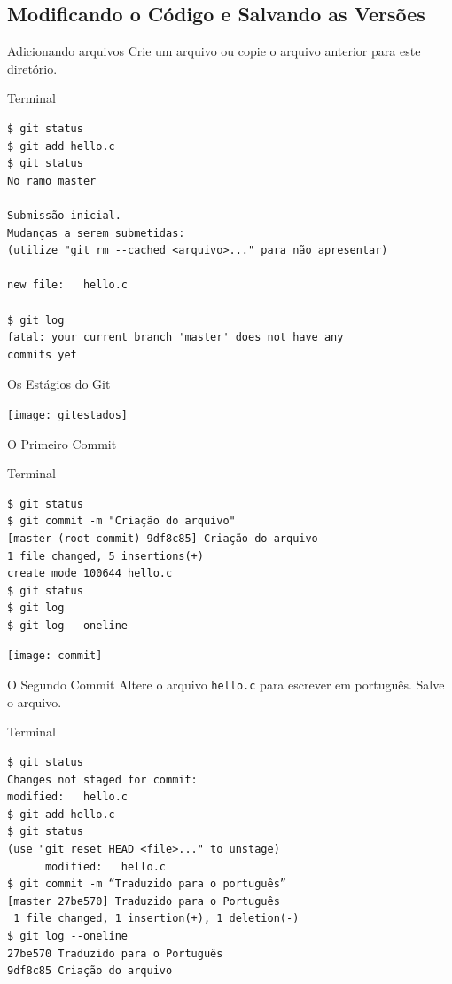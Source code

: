 \subsection{Modificando o Código e Salvando as Versões}
\begin{frame}[fragile]{Adicionando arquivos}
Crie um arquivo  ou copie o arquivo anterior para este diretório. 
\begin{terminal}{Terminal}
\begin{Verbatim}[fontseries=b]
$ git status
$ git add hello.c
$ git status 
No ramo master

Submissão inicial.
Mudanças a serem submetidas:
(utilize "git rm --cached <arquivo>..." para não apresentar)

new file:   hello.c

$ git log
fatal: your current branch 'master' does not have any 
commits yet
\end{Verbatim}
\end{terminal}
\end{frame}	

\begin{frame}{Os Estágios do Git}
\begin{center}
\texttt{[image: gitestados]}
\end{center}	
\end{frame}

\begin{frame}[fragile]{O Primeiro Commit}
\begin{terminal}{Terminal}
\begin{Verbatim}[fontseries=b]
$ git status
$ git commit -m "Criação do arquivo"
[master (root-commit) 9df8c85] Criação do arquivo
1 file changed, 5 insertions(+)
create mode 100644 hello.c
$ git status
$ git log
$ git log --oneline
\end{Verbatim}
\end{terminal}
\begin{center}
	\texttt{[image: commit]}
\end{center}	
\end{frame}
%
%
\begin{frame}[fragile]{O Segundo Commit}
	Altere o arquivo \texttt{hello.c} para escrever em português. Salve o arquivo. 
	\begin{terminal}{Terminal}
		\begin{Verbatim}[fontseries=b]
$ git status
Changes not staged for commit:
modified:   hello.c
$ git add hello.c
$ git status
(use "git reset HEAD <file>..." to unstage)
	  modified:   hello.c
$ git commit -m “Traduzido para o português”
[master 27be570] Traduzido para o Português
 1 file changed, 1 insertion(+), 1 deletion(-)
$ git log --oneline
27be570 Traduzido para o Português
9df8c85 Criação do arquivo
\end{Verbatim}
\end{terminal}
\end{frame}

